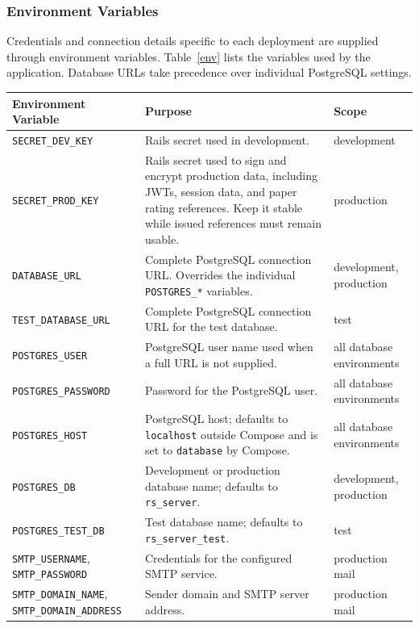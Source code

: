 \documentclass[a4paper, english]{article}
\begin{document}
\subsubsection{Environment Variables}

\label{env-vars}

Credentials and connection details specific to each deployment are supplied through environment variables. Table~\ref{env} lists the variables used by the application. Database URLs take precedence over individual PostgreSQL settings.

\small
\begin{longtable}{L{4.1cm}L{5.7cm}L{2.9cm}}
\toprule
\textbf{Environment Variable} & \textbf{Purpose} & \textbf{Scope} \\
\midrule
\endhead
\verb|SECRET_DEV_KEY| & Rails secret used in development. & development \\
\midrule
\verb|SECRET_PROD_KEY| & Rails secret used to sign and encrypt production data, including JWTs, session data, and paper rating references. Keep it stable while issued references must remain usable. & production \\
\midrule
\verb|DATABASE_URL| & Complete PostgreSQL connection URL. Overrides the individual \verb|POSTGRES_*| variables. & development, production \\
\midrule
\verb|TEST_DATABASE_URL| & Complete PostgreSQL connection URL for the test database. & test \\
\midrule
\verb|POSTGRES_USER| & PostgreSQL user name used when a full URL is not supplied. & all database environments \\
\midrule
\verb|POSTGRES_PASSWORD| & Password for the PostgreSQL user. & all database environments \\
\midrule
\verb|POSTGRES_HOST| & PostgreSQL host; defaults to \verb|localhost| outside Compose and is set to \verb|database| by Compose. & all database environments \\
\midrule
\verb|POSTGRES_DB| & Development or production database name; defaults to \verb|rs_server|. & development, production \\
\midrule
\verb|POSTGRES_TEST_DB| & Test database name; defaults to \verb|rs_server_test|. & test \\
\midrule
\verb|SMTP_USERNAME|, \verb|SMTP_PASSWORD| & Credentials for the configured SMTP service. & production mail \\
\midrule
\verb|SMTP_DOMAIN_NAME|, \verb|SMTP_DOMAIN_ADDRESS| & Sender domain and SMTP server address. & production mail \\

\end{longtable}
\end{document}
